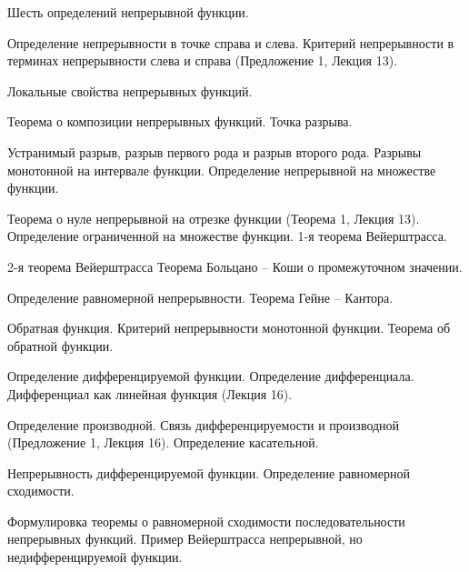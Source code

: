 \begin{problem}Шесть определений непрерывной функции.
\end{problem}
\begin{problem}Определение непрерывности в точке справа и слева. Критерий непрерывности в терминах непрерывности слева и справа (Предложение 1, Лекция 13).
\end{problem}
\begin{problem}Локальные свойства непрерывных функций.
\end{problem}
\begin{problem}Теорема о композиции непрерывных функций. Точка разрыва.
\end{problem}
\begin{problem}Устранимый разрыв, разрыв первого рода и разрыв второго рода. Разрывы монотонной
на интервале функции. Определение непрерывной на множестве функции.
\end{problem}
\begin{problem}Теорема о нуле непрерывной на отрезке функции (Теорема 1, Лекция 13). Определение
ограниченной на множестве функции. 1-я теорема Вейерштрасса.
\end{problem}
\begin{problem}2-я теорема Вейерштрасса Теорема Больцано – Коши о промежуточном значении.
\end{problem}
\begin{problem}Определение равномерной непрерывности. Теорема Гейне – Кантора.
\end{problem}
\begin{problem}Обратная функция. Критерий непрерывности монотонной функции. Теорема об обратной функции.
\end{problem}
\begin{problem}Определение дифференцируемой функции. Определение дифференциала. Дифференциал как линейная функция (Лекция 16).
\end{problem}
\begin{problem}Определение производной. Связь дифференцируемости и производной (Предложение
1, Лекция 16). Определение касательной.
\end{problem}
\begin{problem}Непрерывность дифференцируемой функции. Определение равномерной сходимости.
\end{problem}
\begin{problem}Формулировка теоремы о равномерной сходимости последовательности непрерывных
функций. Пример Вейерштрасса непрерывной, но недифференцируемой функции.
\end{problem}
